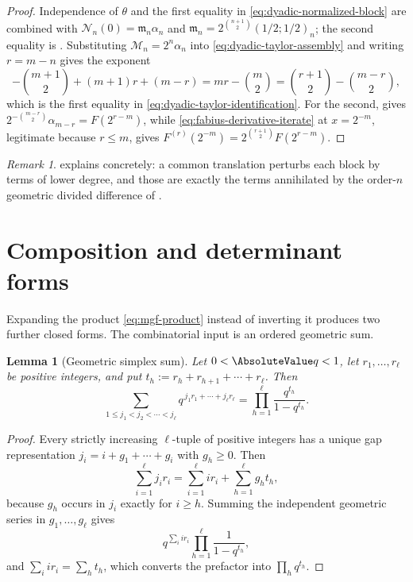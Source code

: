 \documentclass[11pt,a4paper,oneside,openany]{book}
\newtheorem{lemma}[lemma]{Lemma}
\theoremstyle{definition}
\theoremstyle{remark}
\newtheorem{remark}[remark]{Remark}
\begin{document}
\begin{proof}
Independence of $\theta$ and the first equality in \eqref{eq:dyadic-normalized-block}
are  combined with
$\mathcal N_n(0)=\mathfrak m_n\alpha_n$ and
$\mathfrak m_n=2^{\binom{n+1}{2}}(1/2;1/2)_n$; the second equality is
.  Substituting
$\mathcal M_n=2^n\alpha_n$ into \eqref{eq:dyadic-taylor-assembly} and writing $r=m-n$
gives the exponent
\[
 -\binom{m+1}{2}+(m+1)r+(m-r)=mr-\binom m2
 =\binom{r+1}{2}-\binom{m-r}{2},
\]
which is the first equality in \eqref{eq:dyadic-taylor-identification}.  For the second,
 gives
$2^{-\binom{m-r}{2}}\alpha_{m-r}=F(2^{r-m})$, while
\eqref{eq:fabius-derivative-iterate} at $x=2^{-m}$, legitimate because $r\le m$, gives
$F^{(r)}(2^{-m})=2^{\binom{r+1}{2}}F(2^{r-m})$.
\end{proof}

\begin{remark}
 explains  concretely: a
common translation perturbs each block by terms of lower degree, and those are exactly
the terms annihilated by the order-$n$ geometric divided difference of
.
\end{remark}

\section{Composition and determinant forms}

Expanding the product \eqref{eq:mgf-product} instead of inverting it produces two
further closed forms.  The combinatorial input is an ordered geometric sum.

\begin{lemma}[Geometric simplex sum]\label{lem:geometric-simplex}
Let $0<\AbsoluteValue q<1$, let $r_1,\ldots,r_\ell$ be positive integers, and put
$t_h:=r_h+r_{h+1}+\cdots+r_\ell$.  Then
\begin{equation}\label{eq:geometric-simplex}
 \sum_{1\le j_1<j_2<\cdots<j_\ell}
 q^{\,j_1r_1+\cdots+j_\ell r_\ell}
 =\prod_{h=1}^{\ell}\frac{q^{t_h}}{1-q^{t_h}} .
\end{equation}
\end{lemma}

\begin{proof}
Every strictly increasing $\ell$-tuple of positive integers has a unique gap
representation $j_i=i+g_1+\cdots+g_i$ with $g_h\ge0$.  Then
\[
 \sum_{i=1}^{\ell}j_ir_i
 =\sum_{i=1}^{\ell}ir_i+\sum_{h=1}^{\ell}g_ht_h,
\]
because $g_h$ occurs in $j_i$ exactly for $i\ge h$.  Summing the independent geometric
series in $g_1,\ldots,g_\ell$ gives
\[
 q^{\sum_iir_i}\prod_{h=1}^{\ell}\frac1{1-q^{t_h}},
\]
and $\sum_iir_i=\sum_ht_h$, which converts the prefactor into $\prod_hq^{t_h}$.
\end{proof}
\end{document}
